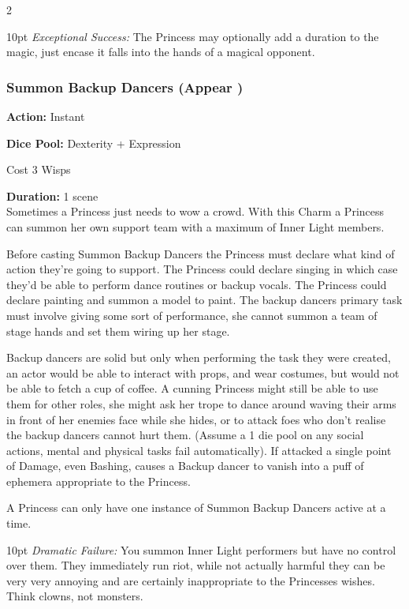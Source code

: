 \begin{multicols}{2}
\begin{myindentpar}{10pt}
\emph{Exceptional Success:}  The Princess may optionally add a duration to the magic, just encase it falls into the hands of a magical opponent. \end{myindentpar}


\subsubsection*{Summon Backup Dancers (Appear \textbullet\textbullet\textbullet)}
\noindent \textbf{Action:} Instant

\noindent \textbf{Dice Pool:} Dexterity + Expression

\noindent Cost 3 Wisps

\noindent \textbf{Duration:} 1 scene \\

\noindent Sometimes a Princess just needs to wow a crowd. With this Charm a Princess can summon her own support team with a maximum of Inner Light members.

Before casting Summon Backup Dancers the Princess must declare what kind of action they're going to support. The Princess could declare singing in which case they'd be able to perform dance routines or backup vocals. The Princess could declare painting and summon a model to paint. The backup dancers primary task must involve giving some sort of performance, she cannot summon a team of stage hands and set them wiring up her stage. 

Backup dancers are solid but only when performing the task they were created, an actor would be able to interact with props, and wear costumes, but would not be able to fetch a cup of coffee. A cunning Princess might still be able to use them for other roles, she might ask her trope to dance around waving their arms in front of her enemies face while she hides, or to attack foes who don't realise the backup dancers cannot hurt them. (Assume a 1 die pool on any social actions, mental and physical tasks fail automatically). If attacked a single point of Damage, even Bashing, causes a Backup dancer to vanish into a puff of ephemera appropriate to the Princess.

A Princess can only have one instance of Summon Backup Dancers active at a time.

\begin{myindentpar}{10pt}     \emph{Dramatic Failure:} You summon Inner Light performers but have no control over them. They immediately run riot, while not actually harmful they can be very very annoying and are certainly inappropriate to the Princesses wishes. Think clowns, not monsters.


\end{myindentpar}
\end{multicols}
